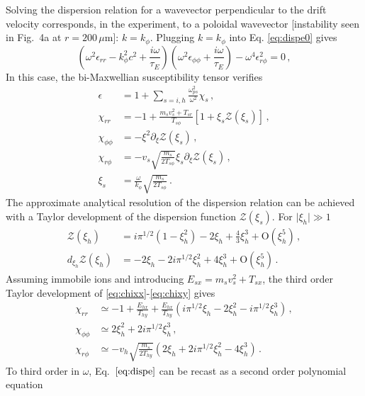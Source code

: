 \documentclass[aps,showpacs,superscriptaddress]{revtex4}
\begin{document}
Solving the dispersion relation for a wavevector perpendicular to the drift velocity corresponds, in the experiment, to a poloidal wavevector [instability seen in Fig.~4a at $r = 200\, \mu$m]: $k = k_\phi$. 
Plugging $k = k_\phi$ into Eq. \eqref{eq:dispe0} gives
\begin{equation}\label{eq:dispe}
\left(\omega^2 \epsilon_{rr} - k_\phi^2c^2 +\frac{i\omega}{\tau_E}\right)
\left(\omega^2 \epsilon_{\phi\phi} +\frac{i\omega}{\tau_E}\right)
-\omega^4 \epsilon_{r\phi}^2 = 0 \, ,
\end{equation}
In this case, the bi-Maxwellian susceptibility tensor verifies \cite[]{POP_Ruyer_2015}
\begin{align}
 \epsilon &=  1 + \sum_{s = i,h}\frac{\omega_{ps}^2}{\omega^2}  \chi_s\, , \label{eq:eps}\\
  \chi_{rr} &= -1  + \frac{m_sv_s^2 + T_{sr} }{T_{s\phi}} [1+\xi_s\mathcal{Z}(\xi_s) ]\, \label{eq:chixx},\\
  \chi_{\phi\phi} &=-\xi^2 \partial_\xi\mathcal{Z}(\xi_s) \, ,\\
  \chi_{r\phi} & =  -v_s\sqrt{\frac{m_s}{2T_{s\phi}}} \xi_s \partial_\xi \mathcal{Z}(\xi_s)  \label{eq:chixy}\, ,\\
  \xi_s  &= \frac{\omega }{k_\phi} \sqrt{\frac{m_s}{2T_{s\phi}}}\label{eq:xi} \, .
\end{align}
The approximate analytical resolution of the dispersion relation can be achieved with a Taylor development of the dispersion function $\mathcal{Z}(\xi_s)$. For $\vert \xi_h \vert\gg 1$
\begin{align}
\mathcal{Z}(\xi_h) & =  i\pi^{1/2}(1-\xi_h^2) -2\xi_h +\frac{4}{3}\xi_h^3 + \mathrm{O}(\xi_h^5) \label{eq:taylor1} \, ,\\
d_{\xi_h} \mathcal{Z}(\xi_h)  &= -2\xi_h -2i\pi^{1/2}\xi_h^2 +4\xi_h^3+ \mathrm{O}(\xi_h^5)\label{eq:taylor2} \, .
\end{align}
Assuming immobile ions and introducing  $E_{sx} = m_sv_s^2 + T_{sx}$, the third order Taylor development of \eqref{eq:chixx}-\eqref{eq:chixy} gives
\begin{align}
  \chi_{rr} &\simeq -1  + \frac{E_{hx} }{T_{hy}} + \frac{E_{hx} }{T_{hy}} ( i\pi^{1/2}\xi_h -2\xi_h^2 -i\pi^{1/2}\xi_h^3) \, ,\\
  \chi_{\phi\phi} &\simeq2\xi_h^2+ 2i\pi^{1/2}\xi_h^3 \, ,\\
  \chi_{r\phi} & \simeq  -v_h\sqrt{\frac{m_s}{2T_{hy}}} (2\xi_h + 2i\pi^{1/2}\xi_h^2 -4\xi_h^3) \, .
\end{align}
To third order in $\omega$, Eq.~$\eqref{eq:dispe}$ can be recast as a second order polynomial equation 
\end{document}
